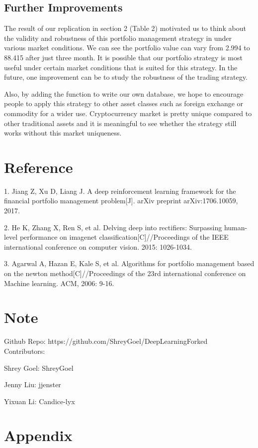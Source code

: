 \documentclass[11pt]{paper}
\begin{document}
	\subsection{Further Improvements}
	The result of our replication in section 2 (Table 2) motivated us to think about the validity and robustness of this portfolio management strategy in under various market conditions. We can see the portfolio value can vary from 2.994 to 88.415 after just three month. It is possible that our portfolio strategy is most useful under certain market conditions that is suited for this strategy. In the future, one improvement can be to study the robustness of the trading strategy.

	Also, by adding the function to write our own database, we hope to encourage people to apply this strategy to other asset classes such as foreign exchange or commodity for a wider use. Cryptocurrency market is pretty unique compared to other traditional assets and it is meaningful to see whether the strategy still works without this market uniqueness.

	\section*{Reference}
	1. Jiang Z, Xu D, Liang J. A deep reinforcement learning framework for the financial portfolio management problem[J]. arXiv preprint arXiv:1706.10059, 2017.

	2. He K, Zhang X, Ren S, et al. Delving deep into rectifiers: Surpassing human-level performance on imagenet classification[C]//Proceedings of the IEEE international conference on computer vision. 2015: 1026-1034.

	3. Agarwal A, Hazan E, Kale S, et al. Algorithms for portfolio management based on the newton method[C]//Proceedings of the 23rd international conference on Machine learning. ACM, 2006: 9-16.
	\section*{Note}
	Github Repo: https://github.com/ShreyGoel/DeepLearningForked\\

	

	Contributors:

	Shrey Goel: ShreyGoel

	Jenny Liu: jjenster

	Yixuan Li: Candice-lyx


	\newpage
	\section*{Appendix}
\end{document}
